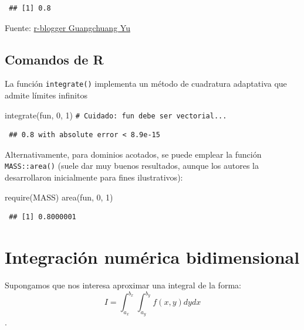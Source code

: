 \documentclass[
]{book}
\newenvironment{Shaded}{\begin{snugshade}}{\end{snugshade}}
\newcommand{\CommentTok}[1]{\textcolor[rgb]{0.56,0.35,0.01}{\textit{#1}}}
\newcommand{\DecValTok}[1]{\textcolor[rgb]{0.00,0.00,0.81}{#1}}
\newcommand{\FunctionTok}[1]{\textcolor[rgb]{0.00,0.00,0.00}{#1}}
\newcommand{\NormalTok}[1]{#1}
\theoremstyle{break}
\theoremstyle{nonumberplain}
\renewcommand{\CommentTok}[1]{\textcolor[rgb]{0.41,0.41,0.41}{\texttt{#1}}}
\begin{document}
\begin{verbatim}
 ## [1] 0.8
\end{verbatim}

Fuente: \href{https://www.r-bloggers.com/one-dimensional-integrals}{r-blogger Guangchuang Yu}

\hypertarget{comandos-de-r}{%
\subsection{Comandos de R}\label{comandos-de-r}}

La función \texttt{integrate()} implementa un método de cuadratura adaptativa que admite límites infinitos

\begin{Shaded}
\begin{Highlighting}[]
\FunctionTok{integrate}\NormalTok{(fun, }\DecValTok{0}\NormalTok{, }\DecValTok{1}\NormalTok{)  }\CommentTok{\# Cuidado: fun debe ser vectorial...}
\end{Highlighting}
\end{Shaded}

\begin{verbatim}
 ## 0.8 with absolute error < 8.9e-15
\end{verbatim}

Alternativamente, para dominios acotados, se puede emplear la función \texttt{MASS::area()} (suele dar muy buenos resultados, aunque los autores la desarrollaron inicialmente para fines ilustrativos):

\begin{Shaded}
\begin{Highlighting}[]
\FunctionTok{require}\NormalTok{(MASS)}
\FunctionTok{area}\NormalTok{(fun, }\DecValTok{0}\NormalTok{, }\DecValTok{1}\NormalTok{)}
\end{Highlighting}
\end{Shaded}

\begin{verbatim}
 ## [1] 0.8000001
\end{verbatim}

\hypertarget{integraciuxf3n-numuxe9rica-bidimensional}{%
\section{Integración numérica bidimensional}\label{integraciuxf3n-numuxe9rica-bidimensional}}

Supongamos que nos interesa aproximar una integral de la forma:
\[I=\int_{a_x}^{b_x}\int_{a_y}^{b_y}f(x, y)dy dx\].
\end{document}
